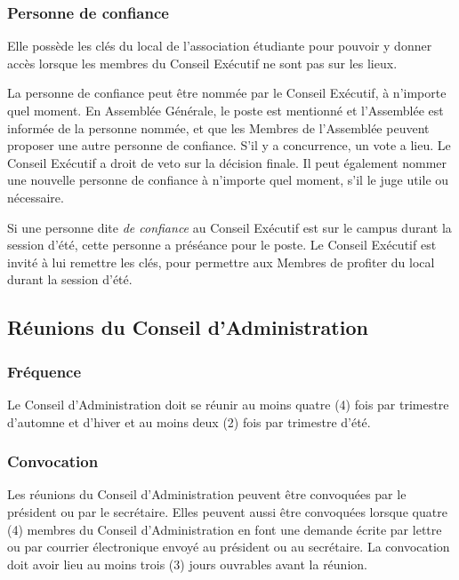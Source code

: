 \documentclass{aediroum}
\begin{document}
\subsubsection{Personne de confiance}\label{sec:personne-de-confiance}
Elle possède les clés du local de l'association étudiante pour pouvoir y donner accès lorsque les membres du Conseil Exécutif ne sont pas sur les lieux.

La personne de confiance peut être nommée par le Conseil Exécutif, à n'importe quel moment.
En Assemblée Générale, le poste est mentionné et l'Assemblée est informée de la personne nommée, et que les Membres de l'Assemblée peuvent proposer une autre personne de confiance. S'il y a concurrence, un vote a lieu.
Le Conseil Exécutif a droit de veto sur la décision finale. Il peut également nommer une nouvelle personne de confiance à n'importe quel moment, s'il le juge utile ou nécessaire.

Si une personne dite \textit{de confiance} au Conseil Exécutif est sur le campus durant la session d'été, cette personne a préséance pour le poste. Le Conseil Exécutif est invité à lui remettre les clés, pour permettre aux Membres de profiter du local durant la session d'été.


\subsection{Réunions du Conseil d'Administration}\label{sec:reunions-du-conseil-dadministration}
\subsubsection{Fréquence}\label{sec:frequence}

Le Conseil d'Administration doit se réunir au moins quatre (4) fois par trimestre d'automne et d'hiver et au moins deux (2) fois par trimestre d'été.

\subsubsection{Convocation}\label{sec:convocation-administration}

Les réunions du Conseil d'Administration peuvent être convoquées par le président ou par le secrétaire. Elles peuvent aussi être convoquées lorsque quatre (4) membres du Conseil d'Administration en font une demande écrite par lettre ou par courrier électronique envoyé au président ou au secrétaire. La convocation doit avoir lieu au moins trois (3) jours ouvrables avant la réunion.
\end{document}
